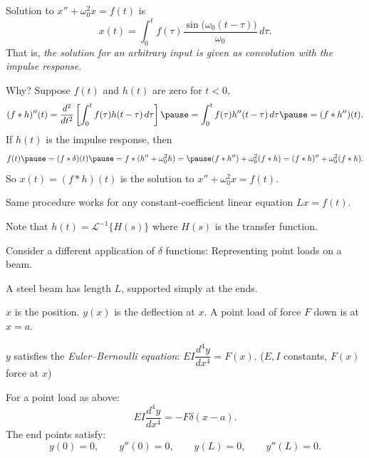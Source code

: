 \documentclass[10pt,aspectratio=169]{beamer}
\begin{document}
\begin{frame}
Solution to $x'' + \omega_0^2 x = f(t)$ is
\[
x(t) = 
\int_0^t
f(\tau) 
\frac{\sin \bigl( \omega_0 (t-\tau) \bigr)}{\omega_0} \, d\tau .
\]
That is, \emph{the solution for an arbitrary input is given as
convolution with the impulse response}.

\medskip
\pause

Why? \pause  Suppose $f(t)$ and $h(t)$ are zero for $t < 0$,
\[
(f * h)''(t) =
\frac{d^2}{dt^2}\left[
\int_0^t
f(\tau) 
h(t-\tau) \, d\tau \right]
\pause
=
\int_0^t
f(\tau) 
h''(t-\tau) \, d\tau
\pause
= (f * h'')(t) .
\]
\pause
If $h(t)$ is the impulse response, then
\[
f(t)
\pause
=
(f * \delta)(t)
\pause
= 
f * (h'' + \omega_0^2 h) =
\pause
(f * h'') + \omega_0^2 (f * h) =
(f * h)'' + \omega_0^2 (f * h) .
\]
\pause
So 
$x(t) = (f * h)(t)$ is the solution to
$x'' + \omega_0^2 x = f(t)$.

\medskip
\pause

Same procedure works for any constant-coefficient linear equation $Lx = f(t)$.

\medskip
\pause

Note that
$h(t) = {\mathcal{L}}^{-1} \bigl\{ H(s) \bigr\}$
where $H(s)$ is the transfer function.

\end{frame}

\begin{frame}
Consider a different application of $\delta$ functions:
Representing point loads on a beam.

\pause
\medskip

A steel beam has length $L$, supported simply at the ends.

$x$ is the position.  $y(x)$ is the deflection at $x$.
%
A point load of force $F$ down is at $x=a$.

\begin{center}
\end{center}
\pause

$y$ satisfies the
\emph{Euler--Bernoulli equation}:
\qquad
$EI \dfrac{d^4 y}{dx^4} = F(x)$.
\quad ($E,I$ constants, $F(x)$ force at $x$)

\pause
\medskip

For a point load as above:
\[
EI \frac{d^4 y}{dx^4} = -F \delta(x-a) .
\]
\pause
\medskip
The end points satisfy:
\[
y(0) = 0, \qquad y''(0) = 0, \qquad
y(L) = 0, \qquad y''(L) = 0.
\]
\end{frame}
\end{document}
